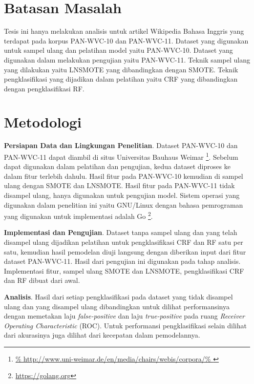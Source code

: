 \section{Batasan Masalah}
\label{sec:batasan-masalah}

Tesis ini hanya melakukan analisis untuk artikel Wikipedia Bahasa Inggris yang
terdapat pada korpus PAN-WVC-10 dan PAN-WVC-11.
Dataset yang digunakan untuk sampel ulang dan pelatihan model yaitu PAN-WVC-10.
Dataset yang digunakan dalam melakukan pengujian yaitu PAN-WVC-11.
Teknik sampel ulang yang dilakukan yaitu LNSMOTE yang dibandingkan dengan
SMOTE.
Teknik pengklasifikasi yang dijadikan dalam pelatihan yaitu CRF yang
dibandingkan dengan pengklasifikasi RF.


\section{Metodologi}
\label{sec:metodologi}

\textbf{Persiapan Data dan Lingkungan Penelitian}.
Dataset PAN-WVC-10 dan PAN-WVC-11 dapat diambil di situs Universitas Bauhaus
Weimar
\footnote{%
	\RaggedRight\url{%
	http://www.uni-weimar.de/en/media/chairs/webis/corpora/%
}}.
Sebelum dapat digunakan dalam pelatihan dan pengujian, kedua dataset diproses
ke dalam fitur terlebih dahulu.
Hasil fitur pada PAN-WVC-10 kemudian di sampel ulang dengan SMOTE dan LNSMOTE.
Hasil fitur pada PAN-WVC-11 tidak disampel ulang, hanya digunakan untuk
pengujian model.
Sistem operasi yang digunakan dalam penelitian ini yaitu GNU/Linux dengan
bahasa pemrograman yang digunakan untuk implementasi adalah Go
\footnote{\RaggedRight\url{https://golang.org}}.


\textbf{Implementasi dan Pengujian}.
Dataset tanpa sampel ulang dan yang telah disampel ulang dijadikan
pelatihan untuk pengklasifikasi CRF dan RF satu per satu, kemudian hasil
pemodelan diuji langsung dengan diberikan input dari fitur dataset PAN-WVC-11.
Hasil dari pengujian ini digunakan pada tahap analisis.
Implementasi fitur, sampel ulang SMOTE dan LNSMOTE, pengklasifikasi CRF dan RF
dibuat dari awal.

\textbf{Analisis}.
Hasil dari setiap pengklasifikasi pada dataset yang tidak disampel ulang dan
yang disampel ulang dibandingkan untuk dilihat performansinya dengan memetakan
laju \textit{false-positive} dan laju \textit{true-positive} pada ruang
\textit{Receiver Operating Characteristic} (ROC).
Untuk performansi pengklasifikasi selain dilihat dari akurasinya juga dilihat
dari kecepatan dalam pemodelannya.

